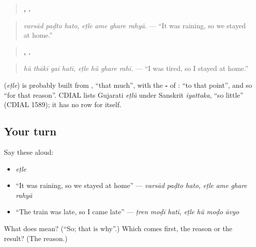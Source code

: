 \begin{quote}
\textbf{  ,    .}
\end{quote}

\begin{quote}
\emph{varsād paḍto hato, eṭle ame ghare rahyā.} — \textquotedblleft{}It was raining, so we stayed at home.\textquotedblright{}
\end{quote}

\begin{quote}
\textbf{   ,    .}
\end{quote}

\begin{quote}
\emph{hũ thākī gaī hatī, eṭle hũ ghare rahī.} — \textquotedblleft{}I was tired, so I stayed at home.\textquotedblright{}
\end{quote}

\begin{cousinweb}
\textbf{} (\emph{eṭle}) is probably built from \textbf{}, \textquotedblleft{}that much\textquotedblright{}, with the \textbf{-} of \textbf{}: \textquotedblleft{}to that point\textquotedblright{}, and so \textquotedblleft{}for that reason\textquotedblright{}. CDIAL lists Gujarati \emph{eṭlũ} under Sanskrit \emph{iyattaka}, \textquotedblleft{}so little\textquotedblright{} (CDIAL 1589); it has no row for \textbf{} itself.
\end{cousinweb}

\subsection*{Your turn}
Say these aloud:

\begin{itemize}
\raggedright
  \item \emph{eṭle}
  \item \textquotedblleft{}It was raining, so we stayed at home\textquotedblright{} — \emph{varsād paḍto hato, eṭle ame ghare rahyā}
  \item \textquotedblleft{}The train was late, so I came late\textquotedblright{} — \emph{ṭren moḍī hatī, eṭle hũ moḍo āvyo}
\end{itemize}

\begin{tcolorbox}[breakable,colback=teal!4,colframe=teal!35!black,title={Before you move on}]
What does \textbf{} mean? (\textquotedblleft{}So; that is why\textquotedblright{}.) Which comes first, the reason or the result? (The reason.)
\end{tcolorbox}
